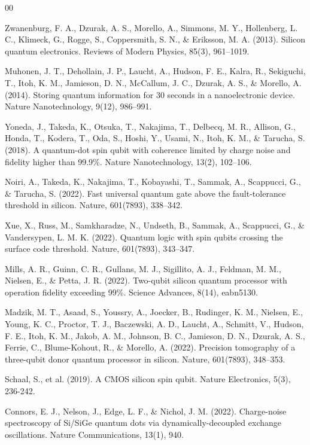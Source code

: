 \documentclass[preprint,12pt, a4paper]{elsarticle}
\begin{document}
\begin{thebibliography}{00}

 Zwanenburg, F. A., Dzurak, A. S., Morello, A., Simmons, M. Y., Hollenberg, L. C., Klimeck, G., Rogge, S., Coppersmith, S. N., \& Eriksson, M. A. (2013). Silicon quantum electronics. Reviews of Modern Physics, 85(3), 961--1019.

 Muhonen, J. T., Dehollain, J. P., Laucht, A., Hudson, F. E., Kalra, R., Sekiguchi, T., Itoh, K. M., Jamieson, D. N., McCallum, J. C., Dzurak, A. S., \& Morello, A. (2014). Storing quantum information for 30 seconds in a nanoelectronic device. Nature Nanotechnology, 9(12), 986--991.

 Yoneda, J., Takeda, K., Otsuka, T., Nakajima, T., Delbecq, M. R., Allison, G., Honda, T., Kodera, T., Oda, S., Hoshi, Y., Usami, N., Itoh, K. M., \& Tarucha, S. (2018). A quantum-dot spin qubit with coherence limited by charge noise and fidelity higher than 99.9\%. Nature Nanotechnology, 13(2), 102--106.

 Noiri, A., Takeda, K., Nakajima, T., Kobayashi, T., Sammak, A., Scappucci, G., \& Tarucha, S. (2022). Fast universal quantum gate above the fault-tolerance threshold in silicon. Nature, 601(7893), 338--342.

 Xue, X., Russ, M., Samkharadze, N., Undseth, B., Sammak, A., Scappucci, G., \& Vandersypen, L. M. K. (2022). Quantum logic with spin qubits crossing the surface code threshold. Nature, 601(7893), 343--347.

 Mills, A. R., Guinn, C. R., Gullans, M. J., Sigillito, A. J., Feldman, M. M., Nielsen, E., \& Petta, J. R. (2022). Two-qubit silicon quantum processor with operation fidelity exceeding 99\%. Science Advances, 8(14), eabn5130.

 Madzik, M. T., Asaad, S., Youssry, A., Joecker, B., Rudinger, K. M., Nielsen, E., Young, K. C., Proctor, T. J., Baczewski, A. D., Laucht, A., Schmitt, V., Hudson, F. E., Itoh, K. M., Jakob, A. M., Johnson, B. C., Jamieson, D. N., Dzurak, A. S., Ferrie, C., Blume-Kohout, R., \& Morello, A. (2022). Precision tomography of a three-qubit donor quantum processor in silicon. Nature, 601(7893), 348--353.

 Schaal, S., et al. (2019). A CMOS silicon spin qubit. Nature Electronics, 5(3), 236-242.

 Connors, E. J., Nelson, J., Edge, L. F., \& Nichol, J. M. (2022). Charge-noise spectroscopy of Si/SiGe quantum dots via dynamically-decoupled exchange oscillations. Nature Communications, 13(1), 940.


\end{thebibliography}
\end{document}
